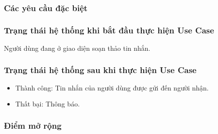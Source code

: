 \subsubsection{Các yêu cầu đặc biệt}

\subsubsection{Trạng thái hệ thống khi bắt đầu thực hiện Use Case}
Người dùng đang ở giao diện soạn thảo tin nhắn.

\subsubsection{Trạng thái hệ thống sau khi thực hiện Use Case}
\begin{itemize}
    \item Thành công: Tin nhắn của người dùng được gửi đến người nhận.
    \item Thất bại: Thông báo.
\end{itemize}

\subsubsection{Điểm mở rộng}